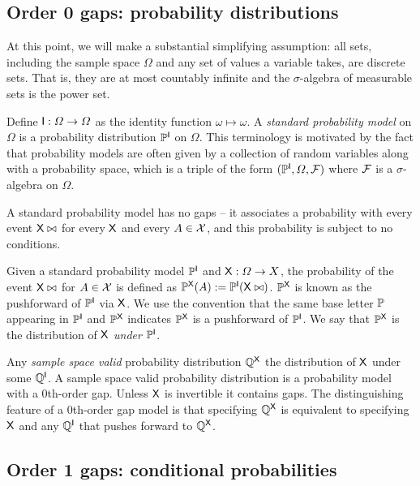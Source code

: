 \subsection{Order 0 gaps: probability distributions}

At this point, we will make a substantial simplifying assumption: all sets, including the sample space $\Omega$ and any set of values a variable takes, are discrete sets. That is, they are at most countably infinite and the $\sigma$-algebra of measurable sets is the power set.

Define $\RV{I}:\Omega\to \Omega$ as the identity function $\omega\mapsto \omega$. A \emph{standard probability model} on $\Omega$ is a probability distribution $\prob{P}^{\RV{I}}$ on $\Omega$. This terminology is motivated by the fact that probability models are often given by a collection of random variables along with a probability space, which is a triple of the form $(\prob{P}^{\RV{I}},\Omega,\sigalg{F})$ where $\sigalg{F}$ is a $\sigma$-algebra on $\Omega$.

A standard probability model has no gaps -- it associates a probability with every event $\RV{X}\yields A$ for every $\RV{X}$ and every $A\in\sigalg{X}$, and this probability is subject to no conditions.

Given a standard probability model $\prob{P}^{\RV{I}}$ and $\RV{X}:\Omega\to X$, the probability of the event $\RV{X}\yields A$ for $A\in\sigalg{X}$ is defined as $\prob{P}^{\RV{X}}(A):=\prob{P}^{\RV{I}}(\RV{X}\yields A)$. $\prob{P}^{\RV{X}}$ is known as the pushforward of $\prob{P}^{\RV{I}}$ via $\RV{X}$. We use the convention that the same base letter $\prob{P}$ appearing in $\prob{P}^{\RV{I}}$ and $\prob{P}^{\RV{X}}$ indicates $\prob{P}^{\RV{X}}$ is a pushforward of $\prob{P}^{\RV{I}}$. We say that $\prob{P}^{\RV{X}}$ is the distribution of $\RV{X}$ \emph{under} $\prob{P}^{\RV{I}}$.

Any \emph{sample space valid} probability distribution $\prob{Q}^{\RV{X}}$ the distribution of $\RV{X}$ under some $\prob{Q}^{\RV{I}}$. A sample space valid probability distribution is a probability model with a 0th-order gap. Unless $\RV{X}$ is invertible it contains gaps. The distinguishing feature of a 0th-order gap model is that specifying $\prob{Q}^{\RV{X}}$ is equivalent to specifying $\RV{X}$ and any $\prob{Q}^{\RV{I}}$ that pushes forward to $\prob{Q}^{\RV{X}}$.

\subsection{Order 1 gaps: conditional probabilities}\label{sec:validity_of_gapprob}

